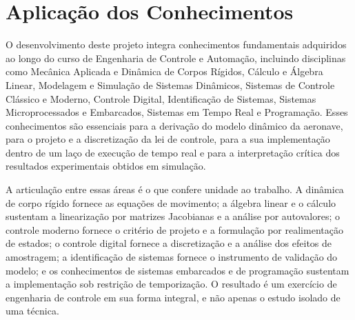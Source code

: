 \documentclass[12pt,a4paper]{article}
\begin{document}
\section{Aplicação dos Conhecimentos}

O desenvolvimento deste projeto integra conhecimentos fundamentais adquiridos ao
longo do curso de Engenharia de Controle e Automação, incluindo disciplinas como
Mecânica Aplicada e Dinâmica de Corpos Rígidos, Cálculo e Álgebra Linear, Modelagem
e Simulação de Sistemas Dinâmicos, Sistemas de Controle Clássico e Moderno, Controle
Digital, Identificação de Sistemas, Sistemas Microprocessados e Embarcados, Sistemas
em Tempo Real e Programação. Esses conhecimentos são essenciais para a derivação do
modelo dinâmico da aeronave, para o projeto e a discretização da lei de controle,
para a sua implementação dentro de um laço de execução de tempo real e para a
interpretação crítica dos resultados experimentais obtidos em simulação.

A articulação entre essas áreas é o que confere unidade ao trabalho. A dinâmica de
corpo rígido fornece as equações de movimento; a álgebra linear e o cálculo
sustentam a linearização por matrizes Jacobianas e a análise por autovalores; o
controle moderno fornece o critério de projeto e a formulação por realimentação de
estados; o controle digital fornece a discretização e a análise dos efeitos de
amostragem; a identificação de sistemas fornece o instrumento de validação do modelo;
e os conhecimentos de sistemas embarcados e de programação sustentam a implementação
sob restrição de temporização. O resultado é um exercício de engenharia de controle
em sua forma integral, e não apenas o estudo isolado de uma técnica.
\end{document}
